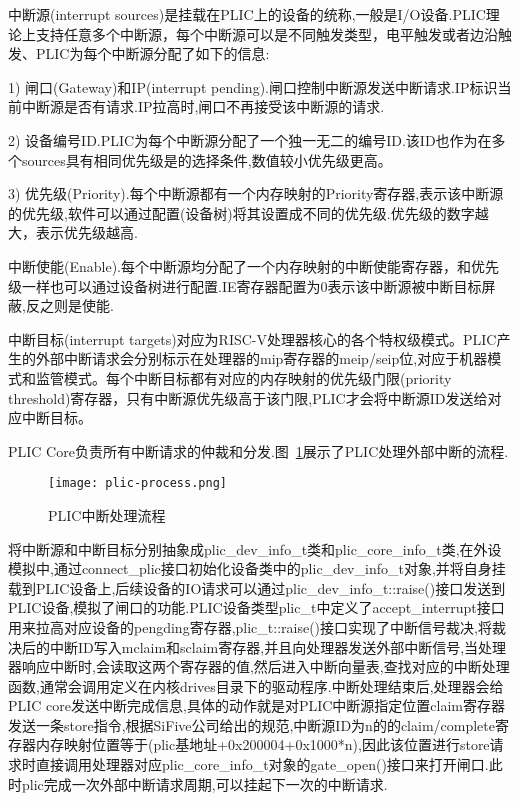 中断源(interrupt sources)是挂载在PLIC上的设备的统称,一般是I/O设备.PLIC理论上支持任意多个中断源，每个中断源可以是不同触发类型，电平触发或者边沿触发、PLIC为每个中断源分配了如下的信息:


1) 闸口(Gateway)和IP(interrupt pending).闸口控制中断源发送中断请求.IP标识当前中断源是否有请求.IP拉高时,闸口不再接受该中断源的请求.


2) 设备编号ID.PLIC为每个中断源分配了一个独一无二的编号ID.该ID也作为在多个sources具有相同优先级是的选择条件,数值较小优先级更高。


3) 优先级(Priority).每个中断源都有一个内存映射的Priority寄存器,表示该中断源的优先级,软件可以通过配置(设备树)将其设置成不同的优先级.优先级的数字越大，表示优先级越高.


中断使能(Enable).每个中断源均分配了一个内存映射的中断使能寄存器，和优先级一样也可以通过设备树进行配置.IE寄存器配置为0表示该中断源被中断目标屏蔽,反之则是使能.


中断目标(interrupt targets)对应为RISC-V处理器核心的各个特权级模式。PLIC产生的外部中断请求会分别标示在处理器的mip寄存器的meip/seip位,对应于机器模式和监管模式。每个中断目标都有对应的内存映射的优先级门限(priority threshold)寄存器，只有中断源优先级高于该门限,PLIC才会将中断源ID发送给对应中断目标。


PLIC Core负责所有中断请求的仲裁和分发.图~\ref{fig:plic-process}展示了PLIC处理外部中断的流程.
\begin{figure}[h]
    \centering
    \texttt{[image: plic-process.png]}
    \caption{PLIC中断处理流程}
    \label{fig:plic-process}
\end{figure}

将中断源和中断目标分别抽象成plic\_dev\_info\_t类和plic\_core\_info\_t类,在外设模拟中,通过connect\_plic接口初始化设备类中的plic\_dev\_info\_t对象,并将自身挂载到PLIC设备上,后续设备的IO请求可以通过plic\_dev\_info\_t::raise()接口发送到PLIC设备,模拟了闸口的功能.PLIC设备类型plic\_t中定义了accept\_interrupt接口用来拉高对应设备的pengding寄存器,plic\_t::raise()接口实现了中断信号裁决,将裁决后的中断ID写入mclaim和sclaim寄存器,并且向处理器发送外部中断信号,当处理器响应中断时,会读取这两个寄存器的值,然后进入中断向量表,查找对应的中断处理函数,通常会调用定义在内核drives目录下的驱动程序.中断处理结束后,处理器会给PLIC core发送中断完成信息,具体的动作就是对PLIC中断源指定位置claim寄存器发送一条store指令,根据SiFive公司给出的规范,中断源ID为n的的claim/complete寄存器内存映射位置等于(plic基地址+0x200004+0x1000*n),因此该位置进行store请求时直接调用处理器对应plic\_core\_info\_t对象的gate\_open()接口来打开闸口.此时plic完成一次外部中断请求周期,可以挂起下一次的中断请求.


